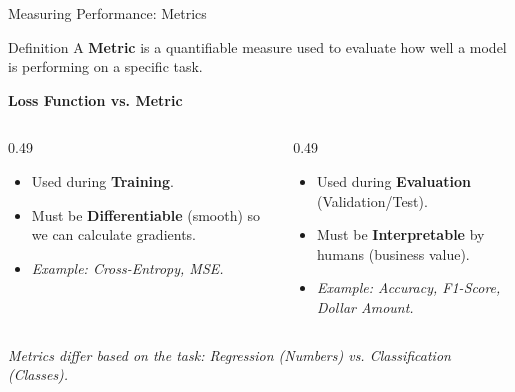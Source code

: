 \begin{frame}{Measuring Performance: Metrics}

    \begin{block}{Definition}
        A \textbf{Metric} is a quantifiable measure used to evaluate how well a model is performing on a specific task.
    \end{block}

    
    \textbf{Loss Function vs. Metric}
    \vspace{-1em}
    
    \begin{columns}[T]
        \begin{column}{0.49\textwidth}
            \begin{tcolorbox}[colback=blue!5, colframe=blue!50, title=Loss (For the Machine)]
                \small
                \begin{itemize}
                    \item Used during \textbf{Training}.
                    \item Must be \textbf{Differentiable} (smooth) so we can calculate gradients.
                    \item \textit{Example: Cross-Entropy, MSE.}
                \end{itemize}
            \end{tcolorbox}
        \end{column}
        
        \begin{column}{0.49\textwidth}
            \begin{tcolorbox}[colback=darkred!5, colframe=darkred!90, title=Metric (For the Human)]
                \small
                \begin{itemize}
                    \item Used during \textbf{Evaluation} (Validation/Test).
                    \item Must be \textbf{Interpretable} by humans (business value).
                    \item \textit{Example: Accuracy, F1-Score, Dollar Amount.}
                \end{itemize}
            \end{tcolorbox}
        \end{column}
    \end{columns}
    
    \centering
    \textit{Metrics differ based on the task: Regression (Numbers) vs. Classification (Classes).}
\end{frame}


